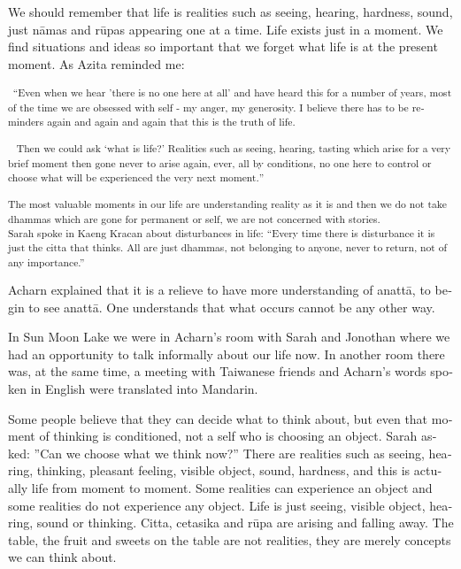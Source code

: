 \textdutch{We should remember that life is realities such as seeing,
hearing, hardness, sound, just nāmas and rūpas appearing one at a time.
Life exists just in a moment. We find situations and ideas so important
that we forget what life is at the present moment. As Azita reminded me:
}

\textsuperscript{~``\textenglish[variant=american]{Even when we hear
'there is no}\textdutch{ }\textenglish[variant=american]{one here at
all' and have heard this for a number of years,}\textdutch{
}\textenglish[variant=american]{most of the time we are obsessed with
self - my anger, my generosity. I believe there has to be reminders
again and again and again that this is the truth of life. }~}

\textsuperscript{~ \textenglish[variant=american]{Then we could ask
`what is life?' }\textdutch{R}\textenglish[variant=american]{ealities
such as seeing, hearing, tasting which arise for a very brief moment
then gone never to arise again, ever, all by conditions, no}\textdutch{
}\textenglish[variant=american]{one here to control or choose what will
be experience}\textdutch{d}\textenglish[variant=american]{ the very next
moment.}\textdutch{''}~}

\textsuperscript{\textdutch{The most valuable moments in our life are
understanding reality as it is and then we do not take dhammas which are
gone for permanent or self, we are not concerned with stories. }{{\\
}}\textdutch{Sarah spoke in Kaeng Kracan about disturbances in life:
``Every time there is disturbance it is just the citta that thinks. All
are just dhammas, not belonging to anyone, never to return, not of any
importance.'' }}

\textdutch{Acharn explained that it is a relieve to have more
understanding of anattā, to begin to see anattā. One understands that
what occurs cannot be any other way.}

\textdutch{In Sun Moon Lake we were in Acharn's room with Sarah and
Jonothan where we had an opportunity to talk informally about our life
now. In another room there was, at the same time, a meeting with
Taiwanese friends and Acharn's words spoken in English were translated
into Mandarin. }

\textdutch{Some people believe that they can decide what to think about,
but even that moment of thinking is conditioned, not a self who is
choosing an object. Sarah asked: ''Can we choose what we think now?''
There are realities such as seeing, hearing, thinking, pleasant feeling,
visible object, sound, hardness, and this is actually life from moment
to moment. Some realities can experience an object and some realities do
not experience any object. Life is just seeing, visible object, hearing,
sound or thinking. Citta, cetasika and rūpa are arising and falling
away. The table, the fruit and sweets on the table are not realities,
they are merely concepts we can think about. }

